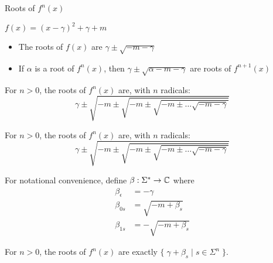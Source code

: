 \begin{frame}[allowframebreaks]{Roots of $f^n(x)$}


  $f(x) = (x-\gamma)^2+\gamma+m$

  \begin{itemize}[\null]
    \item The roots of $f(x)$ are $\gamma\pm\sqrt{-m-\gamma}$
    \item If $\alpha$ is a root of $f^n(x)$, then $\gamma\pm\sqrt{\alpha-m-\gamma}$ are roots of $f^{n+1}(x)$
  \end{itemize}

  \begin{obs}
    For $n>0$, the roots of $f^n(x)$ are, with $n$ radicals:
    $$\gamma\pm\sqrt{-m\pm\sqrt{-m\pm\sqrt{-m\pm\ldots\sqrt{-m-\gamma}}}}$$
  \end{obs}

  \framebreak

  \begin{obs}
    For $n>0$, the roots of $f^n(x)$ are, with $n$ radicals:
    $$\gamma\pm\sqrt{-m\pm\sqrt{-m\pm\sqrt{-m\pm\ldots\sqrt{-m-\gamma}}}}$$
  \end{obs}

  For notational convenience, define $\beta : \Sigma^* \rightarrow \mathbb{C}$ where
  \begin{align*}
    \beta_{\epsilon} &= -\gamma \\
    \beta_{0s} &= \sqrt{-m+\beta_s} \\ 
    \beta_{1s} &= -\sqrt{-m+\beta_s}
  \end{align*}

  For $n>0$, the roots of $f^n(x)$ are exactly $\{\;\gamma+\beta_s\mid s\in\Sigma^n\;\}$.

\end{frame}
